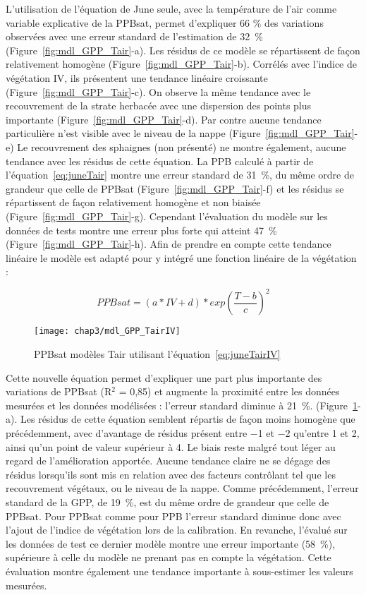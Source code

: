 L'utilisation de l'équation de June seule, avec la température de l'air comme variable explicative de la PPBsat, permet d'expliquer 66 \% des variations observées avec une erreur standard de l'estimation de \SI{32}{\percent} (Figure~\ref{fig:mdl_GPP_Tair}-a).
Les résidus de ce modèle se répartissent de façon relativement homogène (Figure~\ref{fig:mdl_GPP_Tair}-b).
Corrélés avec l'indice de végétation IV, ils présentent une tendance linéaire croissante (Figure~\ref{fig:mdl_GPP_Tair}-c).
On observe la même tendance avec le recouvrement de la strate herbacée avec une dispersion des points plus importante (Figure~\ref{fig:mdl_GPP_Tair}-d).
Par contre aucune tendance particulière n'est visible avec le niveau de la nappe (Figure~\ref{fig:mdl_GPP_Tair}-e)
Le recouvrement des sphaignes (non présenté) ne montre également, aucune tendance avec les résidus de cette équation.
La PPB calculé à partir de l'équation~\ref{eq:juneTair} montre une erreur standard de \SI{31}{\percent}, du même ordre de grandeur que celle de PPBsat (Figure~\ref{fig:mdl_GPP_Tair}-f) et les résidus se répartissent de façon relativement homogène et non biaisée (Figure~\ref{fig:mdl_GPP_Tair}-g).
Cependant l'évaluation du modèle sur les données de tests montre une erreur plus forte qui atteint \SI{47}{\percent}(Figure~\ref{fig:mdl_GPP_Tair}-h).
Afin de prendre en compte cette tendance linéaire le modèle est adapté pour y intégré une fonction linéaire de la végétation :

\begin{equation}\label{eq:juneTairIV}
PPBsat = (a * IV + d) * exp(\frac{T - b}{c})^2
\end{equation}

\begin{figure}
\centering
\texttt{[image: chap3/mdl\_GPP\_TairIV]}
\caption{PPBsat modèles Tair utilisant l'équation~\ref{eq:juneTairIV}}
\label{fig:mdl_GPP_TairIV}
\end{figure}

Cette nouvelle équation permet d'expliquer une part plus importante des variations de PPBsat (R$^{2}$ = 0,85) et augmente la proximité entre les données mesurées et les données modélisées : l'erreur standard diminue à \SI{21}{\percent}. (Figure~\ref{fig:mdl_GPP_TairIV}-a).
Les résidus de cette équation semblent répartis de façon moins homogène que précédemment, avec d'avantage de résidus présent entre \num{-1} et \num{-2} qu'entre \num{1} et 2, ainsi qu'un point de valeur supérieur à \num{4}.
Le biais reste malgré tout léger au regard de l'amélioration apportée.
Aucune tendance claire ne se dégage des résidus lorsqu'ils sont mis en relation avec des facteurs contrôlant tel que les recouvrement végétaux, ou le niveau de la nappe.
Comme précédemment, l'erreur standard de la GPP, de \SI{19}{\percent}, est du même ordre de grandeur que celle de PPBsat.
Pour PPBsat comme pour PPB l'erreur standard diminue donc avec l'ajout de l'indice de végétation lors de la calibration.
En revanche, l'évalué sur les données de test ce dernier modèle montre une erreur importante (\SI{58}{\percent}), supérieure à celle du modèle ne prenant pas en compte la végétation.
Cette évaluation montre également une tendance importante à sous-estimer les valeurs mesurées.


